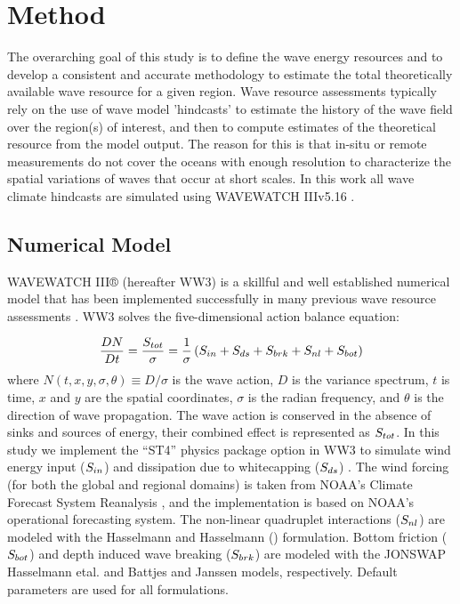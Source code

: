 \section{Method} \label{sec:method}
The overarching goal of this study is to define the wave energy resources and to develop a consistent and accurate methodology to estimate the total theoretically available wave resource for a given region. 
Wave resource assessments typically rely on the use of wave model 'hindcasts' to estimate the history of the wave field over the region(s) of interest, and then to compute estimates of the theoretical resource from the model output. The reason for this is that in-situ or remote measurements do not cover the oceans with enough resolution to characterize the spatial variations of waves that occur at short scales. 
In this work all wave climate hindcasts are simulated using WAVEWATCH III\textregistered v5.16 \citep{tolmanDistributedmemoryConceptsWave2002}.

\subsection{Numerical Model} \label{sec:method:model}
WAVEWATCH III® (hereafter WW3) is a skillful and well established numerical model that has been implemented successfully in many previous wave resource assessments \citep[e.g.,][]{garcia-medinaWaveResourceAssessment2014,yangWaveModelTest2017}.
WW3 solves the five-dimensional action balance equation:

\begin{align}
  \frac{DN}{Dt} = \frac{S_{ tot }}{\sigma} = \frac{1}{\sigma}\left ( S_{ in } + S_{ ds } + S_{ brk } + S_{ nl } + S_{ bot } \right )
\end{align}
where $N(t,x,y,\sigma,\theta) \equiv D/\sigma$ is the wave action, $D$ is the variance spectrum, $t$ is time, $x$ and $y$ are the spatial coordinates, $\sigma$ is the radian frequency, and $\theta$ is the direction of wave propagation.
The wave action is conserved in the absence of sinks and sources of energy, their combined effect is represented as $S_{ tot }$. In this study we implement the ``ST4'' physics package option in WW3 to simulate wind energy input ($S_{ in }$) and dissipation due to whitecapping ($S_{ ds }$) \citep{ardhuinObservationSwellDissipation2009}.
The wind forcing (for both the global and regional domains) is taken from NOAA's Climate Forecast System Reanalysis \citep{sahaNCEPClimateForecast2010}, and the implementation is based on NOAA's operational forecasting system.
The non-linear quadruplet interactions ($S_{ nl }$) are modeled with the Hasselmann and Hasselmann (\citeyear{hasselmannComputationsParameterizationsNonlinear1985}) formulation.
Bottom friction ($S_{ bot }$) and depth induced wave breaking ($S_{ brk }$) are modeled with the JONSWAP Hasselmann etal. \citeyear{hasselmannMeasurementsWindwaveGrowth1973} and Battjes and Janssen \citeyear{battjesEnergyLossSetup1978} models, respectively.
Default parameters are used for all formulations. 

